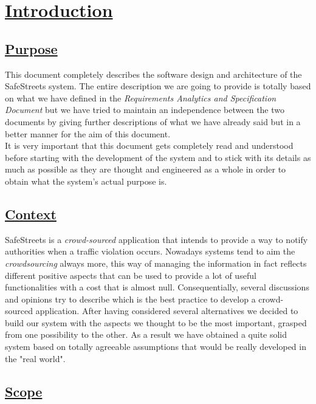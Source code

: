 \section[Introduction]{\hyperlink{toc}{Introduction}}
	\label{sec:introduction} 
	
	\subsection[Purpose]{\hyperlink{toc}{Purpose}}
		\label{sec:purpose}
		
			This document completely describes the software design and architecture of the SafeStreets system. The entire description we are going to provide is totally based on what we have defined in the \emph{Requirements Analytics and Specification Document} \cite{RASD} but we have tried to maintain an independence between the two documents by giving further descriptions of what we have already said but in a better manner for the aim of this document.\\
		
			It is very important that this document gets completely read and understood before starting with the development of the system and to stick with its details as much as possible as they are thought and engineered as a whole in order to obtain what the system's actual purpose is.
			
	\subsection[Context]{\hyperlink{toc}{Context}}
		\label{sec:context}
		
		SafeStreets is a \emph{crowd-sourced} application that intends to provide a way to notify authorities when a traffic violation occurs. Nowadays systems tend to aim the \emph{crowdsourcing} always more, this way of managing the information in fact reflects different positive aspects that can be used to provide a lot of useful functionalities with a cost that is almost null. Consequentially, several discussions and opinions try to describe which is the best practice to develop a crowd-sourced application. After having considered several alternatives \cite{CB} we decided to build our system with the aspects we thought to be the most important, grasped from one possibility to the other. As a result we have obtained a quite solid system based on totally agreeable assumptions that would be really developed in the "real world". 
		
	\subsection[Scope]{\hyperlink{toc}{Scope}}
		\label{sec:scope}
		
